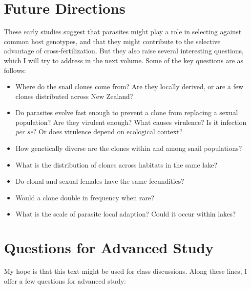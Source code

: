 \documentclass[
  american,
  letterpaper,
]{book}
\providecommand{\tightlist}{%
  \setlength{\itemsep}{0pt}\setlength{\parskip}{0pt}}\usepackage{longtable,booktabs,array}
\begin{document}
\section{Future Directions}\label{future-directions}

These early studies suggest that parasites might play a role in
selecting against common host genotypes, and that they might contribute
to the selective advantage of cross-fertilization. But they also raise
several interesting questions, which I will try to address in the next
volume. Some of the key questions are as follows:

\begin{itemize}
\tightlist
\item
  Where do the snail clones come from? Are they locally derived, or are
  a few clones distributed across New Zealand?
\item
  Do parasites evolve fast enough to prevent a clone from replacing a
  sexual population? Are they virulent enough? What causes virulence? Is
  it infection \emph{per se}? Or does virulence depend on ecological
  context?
\item
  How genetically diverse are the clones within and among snail
  populations?
\item
  What is the distribution of clones across habitats in the same lake?
\item
  Do clonal and sexual females have the same fecundities?
\item
  Would a clone double in frequency when rare?
\item
  What is the scale of parasite local adaption? Could it occur within
  lakes?
\end{itemize}

\section{Questions for Advanced
Study}\label{questions-for-advanced-study}

My hope is that this text might be used for class discussions. Along
these lines, I offer a few questions for advanced study:
\end{document}
